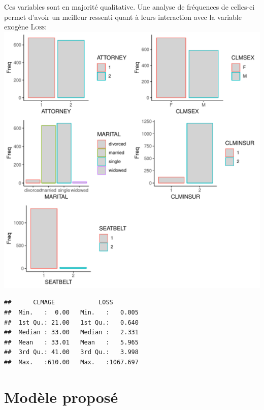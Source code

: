 \documentclass{article}\usepackage[]{graphicx}\usepackage[]{color}
\makeatletter
\def\maxwidth{ %
  \ifdim\Gin@nat@width>\linewidth
    \linewidth
  \else
    \Gin@nat@width
  \fi
}
\newenvironment{kframe}{%
 \def\at@end@of@kframe{}%
 \ifinner\ifhmode%
  \def\at@end@of@kframe{\end{minipage}}%
  \begin{minipage}{\columnwidth}%
 \fi\fi%
 \def\FrameCommand##1{\hskip\@totalleftmargin \hskip-\fboxsep
 \colorbox{shadecolor}{##1}\hskip-\fboxsep
     \hskip-\linewidth \hskip-\@totalleftmargin \hskip\columnwidth}%
 \MakeFramed {\advance\hsize-\width
   \@totalleftmargin\z@ \linewidth\hsize
   \@setminipage}}%
 {\par\unskip\endMakeFramed%
 \at@end@of@kframe}
\newenvironment{knitrout}{}{} %
\makeatother
\begin{document}
\newpage
Ces variables sont en majorité qualitative. Une analyse de fréquences de celles-ci permet d'avoir un meilleur ressenti quant à leurs interaction avec la variable exogène \textsc{Loss}:\\
\begin{knitrout}
\color{fgcolor}
\includegraphics[width=\maxwidth]{figure/unnamed-chunk-2-1} 

\end{knitrout}


\begin{knitrout}
\color{fgcolor}\begin{kframe}
\begin{verbatim}
##      CLMAGE            LOSS         
##  Min.   :  0.00   Min.   :   0.005  
##  1st Qu.: 21.00   1st Qu.:   0.640  
##  Median : 33.00   Median :   2.331  
##  Mean   : 33.01   Mean   :   5.965  
##  3rd Qu.: 41.00   3rd Qu.:   3.998  
##  Max.   :610.00   Max.   :1067.697
\end{verbatim}
\end{kframe}
\end{knitrout}



\section{Modèle proposé}
\label{sec:modele}
\end{document}

